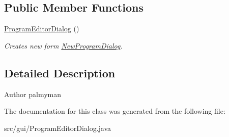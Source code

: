 \subsection*{Public Member Functions}
\begin{DoxyCompactItemize}
\item 
\hypertarget{classgui_1_1ProgramEditorDialog_ad5703137b70b96ad5ef7d3e41ca2da81}{\hyperlink{classgui_1_1ProgramEditorDialog_ad5703137b70b96ad5ef7d3e41ca2da81}{Program\-Editor\-Dialog} ()}\label{classgui_1_1ProgramEditorDialog_ad5703137b70b96ad5ef7d3e41ca2da81}

\begin{DoxyCompactList}\small\item\em Creates new form \hyperlink{classgui_1_1NewProgramDialog}{New\-Program\-Dialog}. \end{DoxyCompactList}\end{DoxyCompactItemize}


\subsection{Detailed Description}
\begin{DoxyAuthor}{Author}
palmyman 
\end{DoxyAuthor}


The documentation for this class was generated from the following file\-:\begin{DoxyCompactItemize}
\item 
src/gui/Program\-Editor\-Dialog.\-java\end{DoxyCompactItemize}
